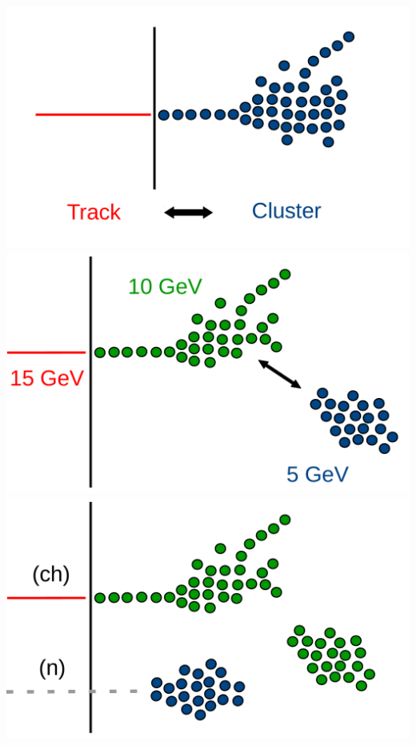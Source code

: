 \documentclass[8pt]{beamer}
\begin{document}
\begin{frame}
\begin{minipage}{0.39\linewidth}
\begin{overprint}
         \centering \includegraphics[width=0.8\linewidth]{TrackClusterAssociationIntro.pdf}
         \centering \includegraphics[width=0.8\linewidth]{TopologicalAssociationsIntro.pdf}
         \centering \includegraphics[width=0.8\linewidth]{PfoCreationIntro.pdf}
      \end{overprint}
    \end{minipage}
  \end{frame}
\end{document}
